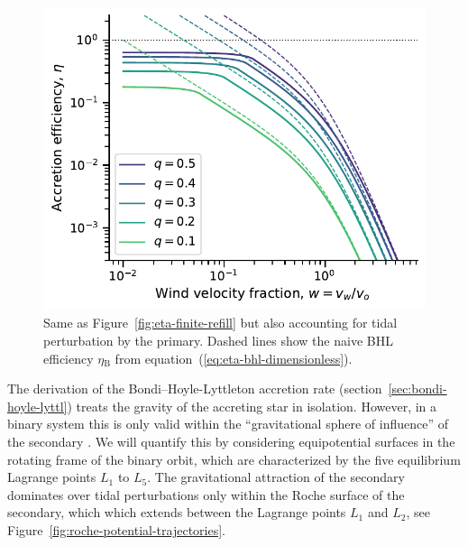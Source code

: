 \documentclass[useAMS, usenatbib, a4paper]{mnras}
\newcommand\bhl{\ensuremath{_{\mathrm{\scriptscriptstyle B}}}}
\begin{document}
\begin{figure}
  \centering
  \includegraphics[width=\linewidth]{notebooks/eta-roche-finite-refill}
  \caption{
    Same as Figure~\ref{fig:eta-finite-refill} but
    also accounting for tidal perturbation by the primary. 
    Dashed lines show the naive BHL efficiency \(\eta\bhl\) from
    equation~(\ref{eq:eta-bhl-dimensionless}).
  }
  \label{fig:eta-tidal-perturbation}
\end{figure}




The derivation of the Bondi--Hoyle-Lyttleton accretion rate
(section~\ref{sec:bondi-hoyle-lyttl})
treats the gravity of the accreting star in isolation.
However, in a binary system this is only valid within the
``gravitational sphere of influence'' of the secondary
\citetext{\citealp{Souami:2020a} and references therein}.
We will quantify this by considering equipotential
surfaces in the rotating frame of the binary orbit,
which are characterized by the five equilibrium Lagrange points
\(L_1\) to \(L_5\).
The gravitational attraction of the secondary dominates
over tidal perturbations only within the Roche surface
of the secondary, which 
which extends between the Lagrange points \(L_1\) and \(L_2\),
see Figure~\ref{fig:roche-potential-trajectories}.
\end{document}

